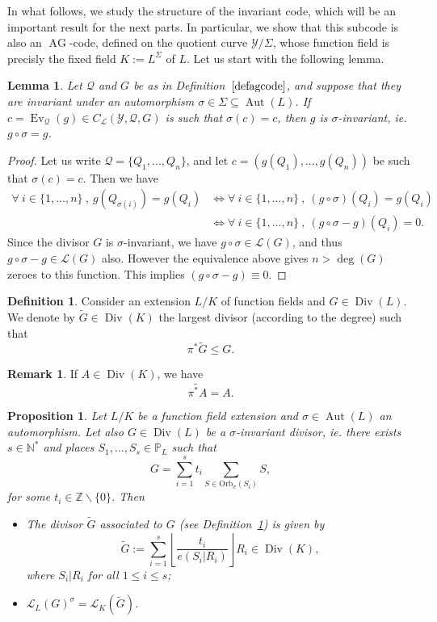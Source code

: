 \documentclass[10pt]{article}
\newtheorem{prop1}[thm]{Proposition}
\newtheorem{lem1}[thm]{Lemma}
\theoremstyle{definition}
\newtheorem{rq1}[thm]{Remark}
\theoremstyle{definition}
\theoremstyle{definition}
\newtheorem{def1}[thm]{Definition}
\newcommand{\N}{\mathbb{N}}
\newcommand{\Z}{\mathbb{Z}}
\newcommand{\PP}{\mathbb{P}}
\newcommand{\su}{\subseteq}
\newcommand{\Y}{\mathcal{Y}}
\newcommand{\QR}{\mathcal{Q}}
\newcommand{\Div}{\operatorname{Div}}
\newcommand{\Aut}{\operatorname{Aut}}
\newcommand{\ag}{\operatorname{AG}}
\newcommand{\calL}{\mathcal{L}}
\begin{document}
In what follows, we study the structure of the invariant code, which will be an important result for the next parts. In particular, we show that this subcode is also an $\ag$-code, defined on the quotient curve $\Y/\Sigma$, whose function field is precisly the fixed field $K:=L^{\Sigma}$ of $L$. Let us start with the following lemma.

\begin{lem1} \label{inv}
Let $\QR$ and $G$ be as in Definition~$\ref{defagcode}$, and suppose that they are invariant under an automorphism $\sigma \in \Sigma \su \Aut(L)$. If $c = \operatorname{Ev}_{\QR}(g) \in C_{\calL}(\Y,\QR,G)$ is such that $\sigma(c) = c$, then $g$ is $\sigma$-invariant, ie. $g\circ \sigma = g$. 
\end{lem1}

\begin{proof}
Let us write $\QR = \{Q_1,...,Q_n\}$, and let $c=(g(Q_1),...,g(Q_n))$ be such that $\sigma(c)=c$. Then we have 
\begin{align*}
\forall \ i \in \{1,...,n\} \ , \ g(Q_{\sigma(i)}) = g(Q_i) &\iff \forall \ i \in \{1,...,n\} \ , \ (g \circ \sigma)(Q_i) =g(Q_i) \\
& \iff \forall \ i \in \{1,...,n\} \ , \ (g\circ \sigma - g)(Q_i) = 0.
\end{align*}
Since the divisor $G$ is $\sigma$-invariant, we have $g \circ \sigma \in \calL(G)$, and thus $g\circ \sigma - g \in \calL(G)$ also.
However the equivalence above gives $n>\deg(G)$ zeroes to this function. This implies $(g \circ \sigma - g) \equiv 0$.
\end{proof}

\begin{def1} \label{pousseavant}
Consider an extension $L/K$ of function fields and $G \in \Div(L)$. We denote by $\tilde{G} \in \Div(K)$ the largest divisor (according to the degree) such that
\[\pi^*\tilde{G} \leq G.\]
\end{def1} 
 
\begin{rq1} \label{jsp}
If $A \in \Div(K)$, we have 
\[\widetilde{\pi^*A}=A.\]
\end{rq1}

\begin{prop1} \label{invrr}
Let $L/K$ be a function field extension and $\sigma \in \Aut(L)$ an automorphism. Let also $G \in \Div(L)$ be a $\sigma$-invariant divisor, \textit{ie.} there exists $s \in \N^*$ and places $S_1,...,S_s \in \PP_L$ such that 
\[G = \sum\limits_{i=1}^s t_i \sum\limits_{S \in \mathrm{Orb}_{\sigma}(S_i)} S,\]
for some $t_i \in \Z \backslash \{0\}$. Then
\begin{itemize}
\item[(i)] The divisor $\tilde{G}$ associated to $G$ (see Definition~\ref{pousseavant}) is given by
\[\tilde{G}:= \sum\limits_{i=1}^s \left\lfloor\dfrac{t_i}{e(S_i|R_i)}\right\rfloor  R_i \in \Div(K),\]
where $S_i|R_i$ for all $1 \leq i \leq s$;
\item[(ii)]  $\calL_L(G)^{\sigma} = \calL_K(\tilde{G})$.
\end{itemize}
\end{prop1}
\end{document}
